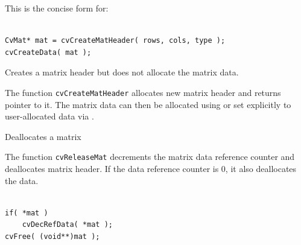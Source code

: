 This is the concise form for:

\begin{lstlisting}

CvMat* mat = cvCreateMatHeader( rows, cols, type );
cvCreateData( mat );

\end{lstlisting}

\label{CreateMatHeader}

Creates a matrix header but does not allocate the matrix data.


\begin{description}
\end{description}

The function \texttt{cvCreateMatHeader} allocates new matrix header and returns pointer to it. The matrix data can then be allocated using  or set explicitly to user-allocated data via .


\label{ReleaseMat}

Deallocates a matrix


\begin{description}
\end{description}


The function \texttt{cvReleaseMat} decrements the matrix data reference counter and deallocates matrix header. If the data reference counter is 0, it also deallocates the data.

\begin{lstlisting}

if( *mat )
    cvDecRefData( *mat );
cvFree( (void**)mat );

\end{lstlisting}


\label{InitMatHeader}

